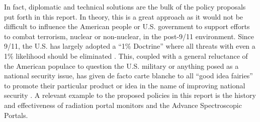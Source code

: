 \documentclass{report}
\begin{document}
In fact, diplomatic and technical solutions are the bulk of the policy proposals put forth in this report.  In theory, this is a great approach as it would not be difficult to influence the American people or U.S. government to support efforts to combat terrorism, nuclear or non-nuclear, in the post-9/11 environment. Since 9/11, the U.S. has largely adopted a \enquote{1\% Doctrine} where all threats with even a 1\% likelihood should be eliminated \cite{pollack2014unthinkable}. This, coupled with a general reluctance of the American populace to question the U.S. military or anything posed as a national security issue, has given de facto carte blanche to all \enquote{good idea fairies} to promote their particular product or idea in the name of improving national security \cite{Fallows2015}. A relevant example to the proposed policies in this report is the history and effectiveness of radiation portal monitors and the Advance Spectroscopic Portals.
\end{document}
